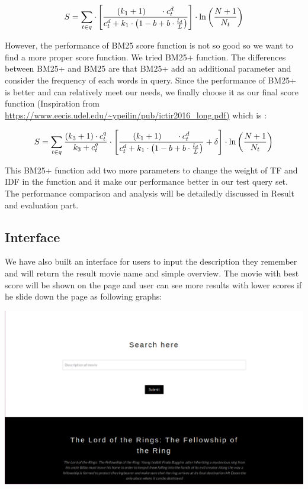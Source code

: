 \documentclass[letterpaper,10pt]{article}
\newenvironment{Figure}
  {\par\medskip\noindent\minipage{\linewidth}}
  {\endminipage\par\medskip}
\begin{document}
\begin{multicols}{2}
    {
    \tiny
    $$
        S = \sum_{t \in q} \cdot\left[\frac{\left(k_{1}+1\right) \\ \cdot c_{t}^{d}}{c_{t}^{d}+k_{1} \cdot\left(1-b+b \cdot \frac{l_{d}}{L}\right)}\right] \cdot \ln \left(\frac{N+1}{N_{t}}\right)
    $$
    }

    However, the performance of BM25 score function is not so good so we want to find a more proper score function. We tried BM25+ function. The differences between BM25+ and BM25 are that BM25+ add an additional parameter and consider the frequency of each words in query. Since the performance of BM25+ is better and can relatively meet our needs, we finally choose it as our final score function (Inspiration from \url{https://www.eecis.udel.edu/~ypeilin/pub/ictir2016_long.pdf)} which is :

    {
    \tiny
    $$
        S = \sum_{t \in q} \frac{\left(k_{3}+1\right) \cdot c_{t}^{q}}{k_{3}+c_{t}^{q}} \cdot\left[\frac{\left(k_{1}+1\right) \\ \cdot c_{t}^{d}}{c_{t}^{d}+k_{1} \cdot\left(1-b+b \cdot \frac{l_{d}}{L}\right)}+\delta\right] \cdot \ln \left(\frac{N+1}{N_{t}}\right)
    $$
    }


    This BM25+ function add two more parameters to change the weight of TF and IDF in the function and it make our performance better in our test query set. The performance comparison and analysis will be detailedly discussed in Result and evaluation part.

    \subsection{Interface}

    We have also built an interface for users to input the description they remember and will return the result movie name and simple overview. The movie with best score will be shown on the page and user can see more results with lower scores if he slide down the page as following graphs:

    \begin{Figure}
        \center
        \includegraphics[width=0.8\linewidth]{interface.jpg}
    \end{Figure}


\end{multicols}
\end{document}
